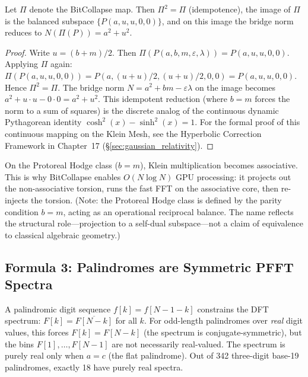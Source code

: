 \begin{proposition}\label{prop:bitcollapse}
Let $\Pi$ denote the BitCollapse map. Then $\Pi^2 = \Pi$ (idempotence), the image of $\Pi$ is the balanced subspace $\{P(a, u, u, 0, 0)\}$, and on this image the bridge norm reduces to $N(\Pi(P)) = a^2 + u^2$.
\end{proposition}

\begin{proof}
Write $u = (b+m)/2$. Then $\Pi(P(a,b,m,\varepsilon,\lambda)) = P(a,u,u,0,0)$. Applying $\Pi$ again: $\Pi(P(a,u,u,0,0)) = P(a, (u+u)/2, (u+u)/2, 0, 0) = P(a,u,u,0,0)$. Hence $\Pi^2 = \Pi$. The bridge norm $N = a^2 + bm - \varepsilon\lambda$ on the image becomes $a^2 + u \cdot u - 0 \cdot 0 = a^2 + u^2$. This idempotent reduction (where $b=m$ forces the norm to a sum of squares) is the discrete analog of the continuous dynamic Pythagorean identity $\cosh^2(x) - \sinh^2(x) = 1$. For the formal proof of this continuous mapping on the Klein Mesh, see the Hyperbolic Correction Framework in Chapter~17 (\S\ref{sec:gaussian_relativity}). \qedhere
\end{proof}

\begin{remark}
On the Protoreal Hodge class ($b = m$), Klein multiplication becomes associative. This is why BitCollapse enables $O(N \log N)$ GPU processing: it projects out the non-associative torsion, runs the fast FFT on the associative core, then re-injects the torsion. (Note: the Protoreal Hodge class is defined by the parity condition $b = m$, acting as an operational reciprocal balance. The name reflects the structural role---projection to a self-dual subspace---not a claim of equivalence to classical algebraic geometry.)
\end{remark}

\subsection{Formula 3: Palindromes are Symmetric PFFT Spectra}

A palindromic digit sequence $f[k] = f[N-1-k]$ constrains the DFT spectrum: $F[k] = \overline{F[N-k]}$ for all $k$. For odd-length palindromes over \emph{real} digit values, this forces $F[k] = F[N-k]$ (the spectrum is conjugate-symmetric), but the bins $F[1], \ldots, F[N-1]$ are not necessarily real-valued. The spectrum is purely real only when $a = c$ (the flat palindrome). Out of 342 three-digit base-19 palindromes, exactly 18 have purely real spectra.

